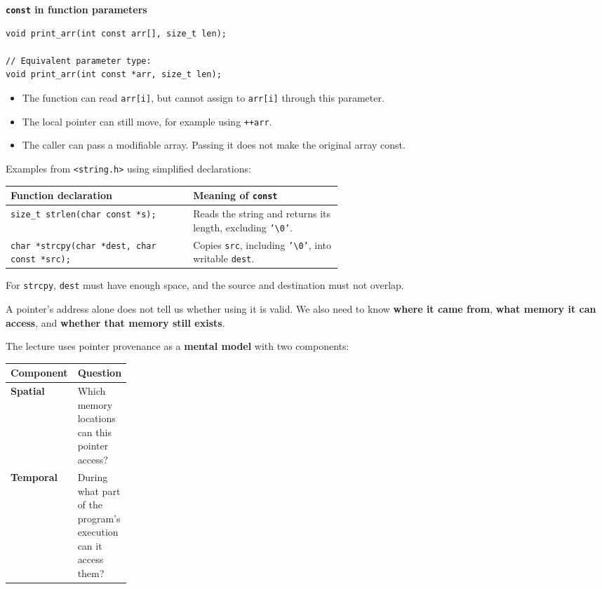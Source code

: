 \documentclass[11pt,a4paper]{article}
\begin{document}
\textbf{\texttt{const} in function parameters}

\begin{lstlisting}[style=cscode]
void print_arr(int const arr[], size_t len);

// Equivalent parameter type:
void print_arr(int const *arr, size_t len);
\end{lstlisting}

\begin{itemize}
    \item The function can read \texttt{arr[i]}, but cannot assign
          to \texttt{arr[i]} through this parameter.
    \item The local pointer can still move, for example using
          \texttt{++arr}.
    \item The caller can pass a modifiable array. Passing it does
          not make the original array const.
\end{itemize}

Examples from \texttt{<string.h>} using simplified declarations:

\begin{longtable}{@{}
    >{\raggedright\arraybackslash}p{0.55\linewidth}
    >{\raggedright\arraybackslash}p{}@{}}
\toprule
\textbf{Function declaration} &
\textbf{Meaning of \texttt{const}} \\
\midrule
\endhead
\bottomrule
\endlastfoot
\texttt{size\_t strlen(char const *s);}
    & Reads the string and returns its length, excluding
      \texttt{'\textbackslash0'}. \\
\texttt{char *strcpy(char *dest, char const *src);}
    & Copies \texttt{src}, including
      \texttt{'\textbackslash0'}, into writable \texttt{dest}. \\
\end{longtable}

For \texttt{strcpy}, \texttt{dest} must have enough space, and
the source and destination must not overlap.


A pointer's address alone does not tell us whether using it is
valid. We also need to know \textbf{where it came from},
\textbf{what memory it can access}, and
\textbf{whether that memory still exists}.

The lecture uses pointer provenance as a \textbf{mental model}
with two components:

\begin{longtable}{@{}
    >{\raggedright\arraybackslash}p{0.20\linewidth}
    >{\raggedright\arraybackslash}p{}@{}}
\toprule
\textbf{Component} & \textbf{Question} \\
\midrule
\endhead
\bottomrule
\endlastfoot
\textbf{Spatial}
    & Which memory locations can this pointer access? \\
\textbf{Temporal}
    & During what part of the program's execution can it
      access them? \\
\end{longtable}
\end{document}
